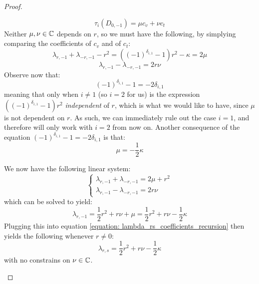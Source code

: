 \begin{proof}
\begin{itemize}
                        $$\tau_i(D_{0, -1}) = \mu c_v + \nu c_t$$
                    Neither $\mu, \nu \in \mathbb{C}$ depends on $r$, so we must have the following, by simplying comparing the coefficients of $c_v$ and of $c_t$:
                        $$\lambda_{r, -1} + \lambda_{-r, -1} - r^2 = ((-1)^{\delta_{i, 1}} - 1) r^2 - \kappa = 2\mu$$
                        $$\lambda_{r, -1} - \lambda_{-r, -1} = 2r\nu$$
                    Observe now that:
                        $$(-1)^{\delta_{i, 1}} - 1 = -2\delta_{i, 1}$$
                    meaning that only when $i \not = 1$ (so $i = 2$ for us) is the expression $((-1)^{\delta_{i, 1}} - 1) r^2$ \textit{independent} of $r$, which is what we would like to have, since $\mu$ is not dependent on $r$. As such, we can immediately rule out the case $i = 1$, and therefore will only work with $i = 2$ from now on. Another consequence of the equation $(-1)^{\delta_{i, 1}} - 1 = -2\delta_{i, 1}$ is that:
                        $$\mu = -\frac12 \kappa$$
                    
                    We now have the following linear system:
                        $$
                            \begin{cases}
                                \lambda_{r, -1} + \lambda_{-r, -1} = 2\mu + r^2 
                                \\
                                \lambda_{r, -1} - \lambda_{-r, -1} = 2r\nu
                            \end{cases}
                        $$
                    which can be solved to yield:
                        $$\lambda_{r, -1} = \frac12 r^2 + r\nu + \mu = \frac12 r^2 + r\nu - \frac12 \kappa$$
                    Plugging this into equation \eqref{equation: lambda_rs_coefficients_recursion} then yields the following whenever $r \not = 0$:
                        \begin{equation} \label{equation: lambda_rs_formula}
                            \lambda_{r, s} = \frac12 r^2 + r\nu - \frac12 \kappa
                        \end{equation}
                    with no constrains on $\nu \in \mathbb{C}$.
                    

\end{itemize}
\end{proof}
